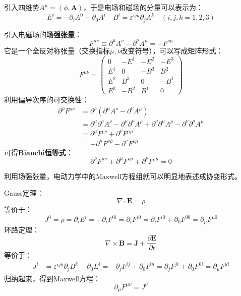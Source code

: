 \documentclass{book}
\begin{document}
引入四维势$A^\mu=(\phi,\mathbf{A})$，于是电场和磁场的分量可以表示为：
\begin{equation}
	E^i=-\partial_iA^0-\partial_0A^i\quad B^i=\varepsilon^{ijk}\partial_jA^k\quad (i,j,k=1,2,3)
\end{equation}

引入电磁场的\textbf{场强张量}：
\begin{equation}
	F^{\mu\nu}\equiv\partial^\mu A^\nu-\partial^\nu A^\mu=-F^{\nu\mu}
\end{equation}
它是一个全反对称张量（交换指标$\mu,\nu$改变符号），可以写成矩阵形式：
\begin{equation}
	F^{\mu\nu}=\begin{pmatrix}0&-E^1&-E^2&-E^3\\E^1&0&-B^3&B^2\\E^2&B^3&0&-B^1\\E^3&-B^2&B^1&0\end{pmatrix}
\end{equation}
利用偏导次序的可交换性：
\begin{equation}
\begin{aligned}
\partial^{\rho}F^{\mu\nu} &= \partial^\rho(\partial^\mu A^\nu - \partial^\nu A^\mu) \\
&= \partial^\mu\partial^\rho A^\nu - \partial^\mu\partial^\nu A^\rho 
+ \partial^\nu\partial^\mu A^\rho - \partial^\nu\partial^\rho A^\mu \\
&= \partial^{\mu}F^{\rho\nu} + \partial^{\nu}F^{\mu\rho} \\
&= -\partial^{\mu}F^{\nu\rho} - \partial^{\nu}F^{\rho\mu}
\end{aligned}
\end{equation}
可得\textbf{Bianchi恒等式}：
\begin{equation}
	\partial^\rho F^{\mu\nu}+\partial^\mu F^{\nu\rho}+\partial^\nu F^{\rho\mu}=0
\end{equation}

利用场强张量，电动力学中的Maxwell方程组就可以明显地表述成协变形式。

Gauss定理：
\begin{equation}
	\nabla\cdot\mathbf{E}=\rho
\end{equation}
等价于：
\begin{equation}
	J^0=\rho=\partial_iE^i=-\partial_iF^{0i}=\partial_iF^{i0}=\partial_iF^{i0}+\partial_0F^{00}=\partial_\mu F^{\mu0}
\end{equation}
环路定理：
\begin{equation}
	\nabla\times\mathbf{B}=\mathbf{J}+\frac{\partial\mathbf{E}}{\partial t}
\end{equation}
等价于：
\begin{equation}
	\begin{aligned}J^i&=\varepsilon^{ijk}\partial_jB^k-\partial_0E^i=-\partial_jF^{ij}+\partial_0F^{0i}=\partial_jF^{ji}+\partial_0F^{0i}=\partial_\mu F^{\mu i}\end{aligned}
\end{equation}
归纳起来，得到Maxwell方程：
\begin{equation}
\partial_{\mu}F^{\mu\nu}=J^{\nu}	
\end{equation}
\end{document}

